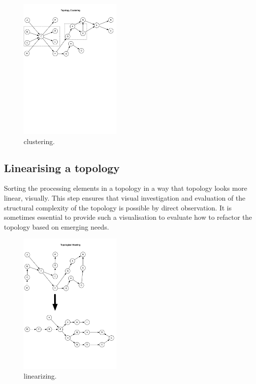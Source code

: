 \begin{figure}[H]
	\begin{center}
		\includegraphics[width=5cm]{images/clustering}
		\caption{clustering.}
		\label{fig:clustering}
	\end{center}
\end{figure}

\subsection{Linearising a topology}

Sorting the processing elements in a topology in a way that topology looks more linear, visually. This step ensures that visual investigation and evaluation of the structural complexity of the topology is possible by direct observation. It is sometimes essential to provide such a visualisation to evaluate how to refactor the topology based on emerging needs.

\begin{figure}[H]
	\begin{center}
		\includegraphics[width=5cm]{images/linearizing}
		\caption{linearizing.}
		\label{fig:linearizing}
	\end{center}
\end{figure}
